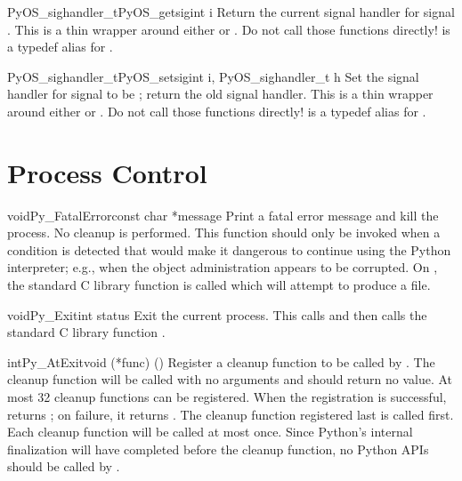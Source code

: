 \begin{cfuncdesc}{PyOS_sighandler_t}{PyOS_getsig}{int i}
  Return the current signal handler for signal .  This is a
  thin wrapper around either  or
  .  Do not call those functions directly!
   is a typedef alias for .
\end{cfuncdesc}

\begin{cfuncdesc}{PyOS_sighandler_t}{PyOS_setsig}{int i, PyOS_sighandler_t h}
  Set the signal handler for signal  to be ; return the
  old signal handler.  This is a thin wrapper around either
   or .  Do not call those
  functions directly!   is a typedef alias
  for .
\end{cfuncdesc}


\section{Process Control \label{processControl}}

\begin{cfuncdesc}{void}{Py_FatalError}{const char *message}
  Print a fatal error message and kill the process.  No cleanup is
  performed.  This function should only be invoked when a condition is
  detected that would make it dangerous to continue using the Python
  interpreter; e.g., when the object administration appears to be
  corrupted.  On \UNIX, the standard C library function
   is called which will attempt to
  produce a  file.
\end{cfuncdesc}

\begin{cfuncdesc}{void}{Py_Exit}{int status}
  Exit the current process.  This calls
   and then calls the
  standard C library function
  .
\end{cfuncdesc}

\begin{cfuncdesc}{int}{Py_AtExit}{void (*func) ()}
  Register a cleanup function to be called by
  .  The cleanup
  function will be called with no arguments and should return no
  value.  At most 32 cleanup functions can be
  registered.  When the registration is successful,
   returns ; on failure, it returns
  .  The cleanup function registered last is called first.
  Each cleanup function will be called at most once.  Since Python's
  internal finalization will have completed before the cleanup
  function, no Python APIs should be called by .
\end{cfuncdesc}


